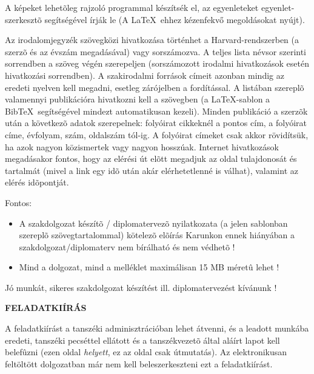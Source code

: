 A képeket lehetõleg rajzoló programmal készítsék el, az egyenleteket egyenlet-szerkesztõ segítségével írják le (A \LaTeX~ehhez kézenfekvő megoldásokat nyújt).

Az irodalomjegyzék szövegközi hivatkozása történhet a Harvard-rendszerben (a szerzõ és az évszám megadásával) vagy sorszámozva. A teljes lista névsor szerinti sorrendben a szöveg végén szerepeljen (sorszámozott irodalmi hivatkozások esetén hivatkozási sorrendben). A szakirodalmi források címeit azonban mindig az eredeti nyelven kell megadni, esetleg zárójelben a fordítással. A listában szereplõ valamennyi publikációra hivatkozni kell a szövegben (a \LaTeX-sablon a Bib\TeX~segítségével mindezt automatikusan kezeli). Minden publikáció a szerzõk után a következõ adatok szerepelnek: folyóirat cikkeknél a pontos cím, a folyóirat címe, évfolyam, szám, oldalszám tól-ig. A folyóirat címeket csak akkor rövidítsük, ha azok nagyon közismertek vagy nagyon hosszúak. Internet hivatkozások megadásakor fontos, hogy az elérési út elõtt megadjuk az oldal tulajdonosát és tartalmát (mivel a link egy idõ után akár elérhetetlenné is válhat), valamint az elérés idõpontját.

\vspace{5mm}
Fontos:
\begin{itemize}
	\item A szakdolgozat készítõ / diplomatervezõ nyilatkozata (a jelen sablonban szereplõ szövegtartalommal) kötelezõ elõírás Karunkon ennek hiányában a szakdolgozat/diplomaterv nem bírálható és nem védhetõ !
	\item Mind a dolgozat, mind a melléklet maximálisan 15 MB méretû lehet !
\end{itemize}

\vspace{5mm}
\begin{center}
Jó munkát, sikeres szakdolgozat készítést ill. diplomatervezést kívánunk !
\end{center}

\normalsize

\clearpage
\begin{center}
\large
\textbf{FELADATKIÍRÁS}\\
\end{center}

A feladatkiírást a tanszéki adminisztrációban lehet átvenni, és a leadott munkába eredeti, tanszéki pecséttel ellátott és a tanszékvezetõ által aláírt lapot kell belefûzni (ezen oldal \emph{helyett}, ez az oldal csak útmutatás). Az elektronikusan feltöltött dolgozatban már nem kell beleszerkeszteni ezt a feladatkiírást.

\begin{flushright}
 \vspace*{1cm}
 \makebox[7cm]{\rule{6cm}{.4pt}}\\
 \\
\end{flushright}
\vfill



